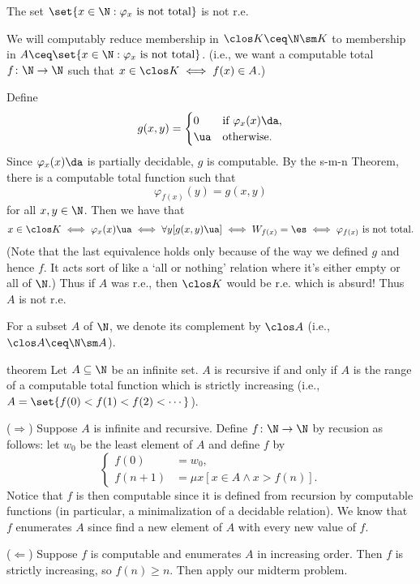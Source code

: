 \documentclass[class=article, crop=false]{standalone}
\begin{document}
\begin{ex}{\label{ex:being-not-total-is-not-r.e.}}
  The set $\set{x \in \N : \varphi_x \text{ is not total}}$ is not r.e.

  \begin{pf}
    We will computably reduce membership in $\clos K \ceq \N \sm K$ to membership in $A \ceq \set{x \in \N : \varphi_x \text{ is not total}}$. (i.e., we want a computable total $f\colon \N \to \N$ such that $x \in \clos K \iff f(x) \in A$.)

    Define
      \[
        g(x,y) =
          \begin{cases}
            0 & \text{if } \varphi_x(x)\da, \\
            \ua & \text{otherwise}.
          \end{cases}
      \]
    Since $\varphi_x(x)\da$ is partially decidable, $g$ is computable. By the s-m-n Theorem, there is a computable total function such that
      \[
        \varphi_{f(x)}(y) = g(x,y)
      \]
    for all $x,y \in \N$. Then we have that
      \[
      x \in \clos K \iff \varphi_x(x) \ua\\
        \iff \forall y [g(x,y) \ua] \\
        \iff W_{f(x)} = \es \\
        \iff \varphi_{f(x)} \text{ is not total}.
      \]
    (Note that the last equivalence holds only because of the way we defined $g$ and hence $f$. It acts sort of like a `all or nothing' relation where it's either empty or all of $\N$.) Thus if $A$ was r.e., then $\clos K$ would be r.e. which is absurd! Thus $A$ is not r.e.
  \end{pf}
\end{ex}
\begin{rem}
  For a subset $A$ of $\N$, we denote its complement by $\clos A$ (i.e., $\clos A \ceq \N \sm A$).
\end{rem}

\begin{result}{theorem}{\label{thm:increasing-enumeration-is-recursive}}
  Let $A \subseteq \N$ be an infinite set. $A$ is recursive if and only if $A$ is the range of a computable total function which is strictly increasing (i.e., $A = \set{f(0) < f(1) < f(2) < \cdots}$).
\end{result}
\begin{pf}
  ($\Rightarrow$) Suppose $A$ is infinite and recursive. Define $f\colon \N \to \N$ by recusion as follows: let $w_0$ be the least element of $A$ and define $f$ by
    \[
      \begin{cases}
        f(0) &= w_0, \\
        f(n+1) &= \mu x [x \in A \land x > f(n)].
      \end{cases}
    \]
  Notice that $f$ is then computable since it is defined from recursion by computable functions (in particular, a minimalization of a decidable relation). We know that $f$ enumerates $A$ since find a new element of $A$ with every new value of $f$.

  ($\Leftarrow$) Suppose $f$ is computable and enumerates $A$ in increasing order. Then $f$ is strictly increasing, so $f(n) \geq n$. Then apply our midterm problem.
\end{pf}
\end{document}
